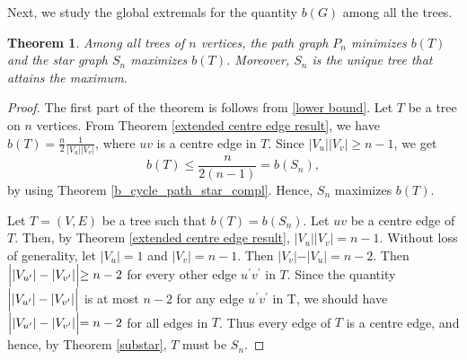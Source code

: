\documentclass[12pt]{article}
\newtheorem{theorem}{Theorem}[section]
\begin{document}
Next, we study the global extremals for the quantity $b(G)$ among all the trees.
\begin{theorem}\label{extremal trees}
Among all trees of $n$ vertices, the path graph $P_n$ minimizes $b(T)$ and the star graph $S_n$ maximizes $b(T)$. Moreover, $S_n$ is the unique tree that attains the maximum.
\end{theorem}

\begin{proof}
The first part of the theorem is follows from \ref{lower bound}.
Let $T$ be a tree on $n$ vertices.  From Theorem \ref{extended centre edge result}, we have $b(T)=\frac{n}{2} \frac{1}{\vert V_{u}\vert \vert V_{v}\vert}$, where $uv$ is a centre edge in $T$. Since $\vert V_{u}\vert \vert V_{v}\vert \geq n-1$, we get $$b(T) \leq \frac{n}{2(n-1)}=b(S_n),$$
by using Theorem \ref{b_cycle_path_star_compl}. Hence, $S_n$ maximizes $b(T)$.

Let $T=(V,E)$ be a tree such that $b(T)=b(S_n)$. Let $uv$ be a centre edge of $T$. Then, by Theorem \ref{extended centre edge result}, $\vert V_{u}\vert \vert V_{v}\vert=n-1$. Without loss of generality, let $\vert V_u\vert=1$ and $\vert V_v \vert=n-1$. Then $ \vert V_v\vert-\vert V_u\vert=n-2$. Then $\Bigl| \vert V_{u^\prime} \vert - \vert V_{v^\prime}\vert \Bigl| \geq n-2$ for every other edge $u^\prime v^\prime$ in $T$. Since the quantity $\Bigl| \vert V_{u^\prime}\vert -\vert V_{v^\prime}\vert \Bigl| $ is at most $n-2$ for any edge $u^\prime v^\prime$ in T, we should have $\Bigl| \vert V_{u^\prime}\vert -\vert V_{v^\prime}\vert \Bigl| =n-2$ for all edges in $T$. Thus every edge of $T$ is a centre edge, and hence, by Theorem \ref{substar},  $T$ must be $S_n$.
\end{proof}
\end{document}
